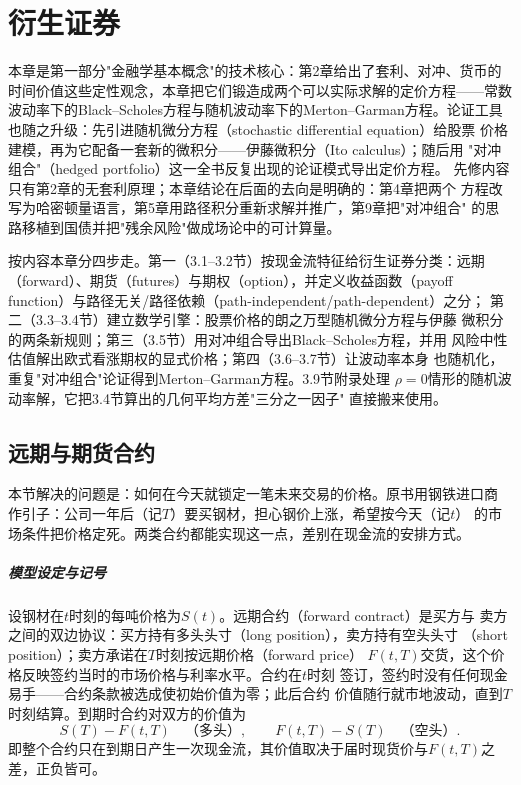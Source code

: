 \chapter{衍生证券}

本章是第一部分"金融学基本概念"的技术核心：第2章给出了套利、对冲、货币的
时间价值这些定性观念，本章把它们锻造成两个可以实际求解的定价方程——常数
波动率下的Black--Scholes方程与随机波动率下的Merton--Garman方程。论证工具
也随之升级：先引进随机微分方程（stochastic differential equation）给股票
价格建模，再为它配备一套新的微积分——伊藤微积分（Ito calculus）；随后用
"对冲组合"（hedged portfolio）这一全书反复出现的论证模式导出定价方程。
先修内容只有第2章的无套利原理；本章结论在后面的去向是明确的：第4章把两个
方程改写为哈密顿量语言，第5章用路径积分重新求解并推广，第9章把"对冲组合"
的思路移植到国债并把"残余风险"做成场论中的可计算量。

按内容本章分四步走。第一（3.1--3.2节）按现金流特征给衍生证券分类：远期
（forward）、期货（futures）与期权（option），并定义收益函数（payoff
function）与路径无关/路径依赖（path-independent/path-dependent）之分；
第二（3.3--3.4节）建立数学引擎：股票价格的朗之万型随机微分方程与伊藤
微积分的两条新规则；第三（3.5节）用对冲组合导出Black--Scholes方程，并用
风险中性估值解出欧式看涨期权的显式价格；第四（3.6--3.7节）让波动率本身
也随机化，重复"对冲组合"论证得到Merton--Garman方程。3.9节附录处理
$\rho=0$情形的随机波动率解，它把3.4节算出的几何平均方差"三分之一因子"
直接搬来使用。

\section{远期与期货合约}

本节解决的问题是：如何在今天就锁定一笔未来交易的价格。原书用钢铁进口商
作引子：公司一年后（记$T$）要买钢材，担心钢价上涨，希望按今天（记$t$）
的市场条件把价格定死。两类合约都能实现这一点，差别在现金流的安排方式。

\paragraph{模型设定与记号}
设钢材在$t$时刻的每吨价格为$S(t)$。远期合约（forward contract）是买方与
卖方之间的双边协议：买方持有多头头寸（long position），卖方持有空头头寸
（short position）；卖方承诺在$T$时刻按远期价格（forward price）
$F(t,T)$交货，这个价格反映签约当时的市场价格与利率水平。合约在$t$时刻
签订，签约时没有任何现金易手——合约条款被选成使初始价值为零；此后合约
价值随行就市地波动，直到$T$时刻结算。到期时合约对双方的价值为
\begin{equation*}
S(T)-F(t,T)\quad\text{（多头）},\qquad F(t,T)-S(T)\quad\text{（空头）}.
\end{equation*}
即整个合约只在到期日产生一次现金流，其价值取决于届时现货价与$F(t,T)$之
差，正负皆可。

